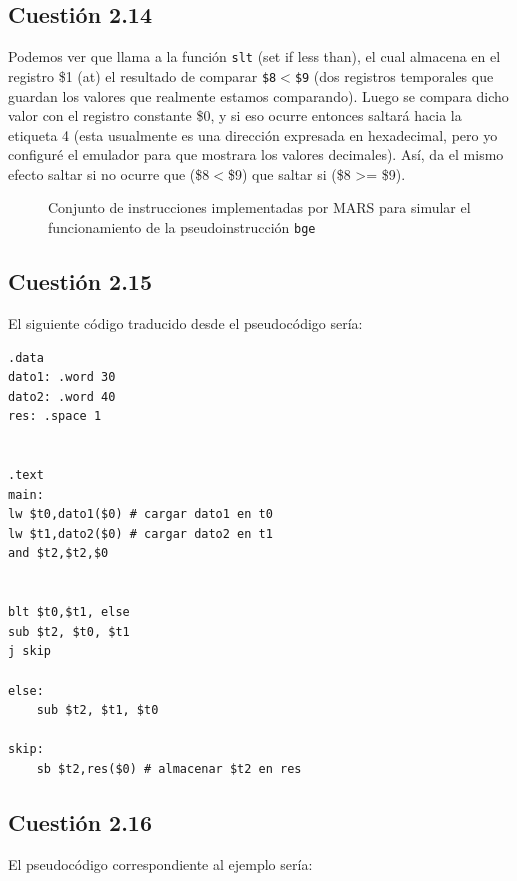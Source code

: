 \documentclass[11pt]{article}
\begin{document}
\begin{large}
\begin{flushleft}
\subsection*{Cuestión 2.14}
Podemos ver que llama a la función \texttt{slt} (set if less than), el cual almacena en el registro \$1 (at) el resultado de comparar \texttt{\$8$<$\$9} (dos registros temporales que guardan los valores que realmente estamos comparando). Luego se compara dicho valor con el registro constante \$0, y si eso ocurre entonces saltará hacia la etiqueta 4 (esta usualmente es una dirección expresada en hexadecimal, pero yo configuré el emulador para que mostrara los valores decimales). Así, da el mismo efecto saltar si no ocurre que (\$8$<$\$9) que saltar si (\$8 >= \$9).

\begin{figure}[H]
    \centering
    \caption{Conjunto de instrucciones implementadas por MARS para simular el funcionamiento de la pseudoinstrucción \texttt{bge}}
    \label{fig:my_label}
\end{figure}


\subsection*{Cuestión 2.15}
El siguiente código traducido desde el pseudocódigo sería:
\begin{listing}[h]
\begin{verbatim}
.data
dato1: .word 30
dato2: .word 40
res: .space 1


.text
main: 
lw $t0,dato1($0) # cargar dato1 en t0
lw $t1,dato2($0) # cargar dato2 en t1
and $t2,$t2,$0


blt $t0,$t1, else
sub $t2, $t0, $t1
j skip

else: 
    sub $t2, $t1, $t0
    
skip: 
    sb $t2,res($0) # almacenar $t2 en res

\end{verbatim}
\end{listing}

\subsection*{Cuestión 2.16}
El pseudocódigo correspondiente al ejemplo sería:


\end{flushleft}
\end{large}
\end{document}
